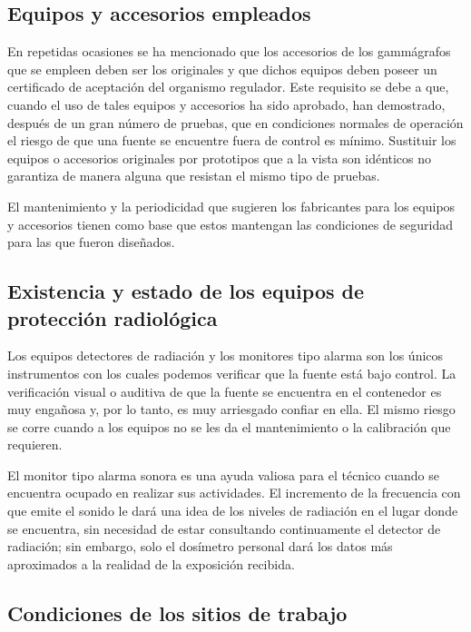 \subsection{Equipos y accesorios empleados}

En repetidas ocasiones se ha mencionado que los accesorios de los gammágrafos que se empleen deben ser los originales y que dichos equipos deben poseer un certificado de aceptación del organismo regulador. Este requisito se debe a que, cuando el uso de tales equipos y accesorios ha sido aprobado, han demostrado, después de un gran número de pruebas, que en condiciones normales de operación el riesgo de que una fuente se encuentre fuera de control es mínimo. Sustituir los equipos o accesorios originales por prototipos que a la vista son idénticos no garantiza de manera alguna que resistan el mismo tipo de pruebas.

El mantenimiento y la periodicidad que sugieren los fabricantes para los equipos y accesorios tienen como base que estos mantengan las condiciones de seguridad para las que fueron diseñados.

\subsection{Existencia y estado de los equipos de protección radiológica}

Los equipos detectores de radiación y los monitores tipo alarma son los únicos instrumentos con los cuales podemos verificar que la fuente está bajo control. La verificación visual o auditiva de que la fuente se encuentra en el contenedor es muy engañosa y, por lo tanto, es muy arriesgado confiar en ella. El mismo riesgo se corre cuando a los equipos no se les da el mantenimiento o la calibración que requieren.

El monitor tipo alarma sonora es una ayuda valiosa para el técnico cuando se encuentra ocupado en realizar sus actividades. El incremento de la frecuencia con que emite el sonido le dará una idea de los niveles de radiación en el lugar donde se encuentra, sin necesidad de estar consultando continuamente el detector de radiación; sin embargo, solo el dosímetro personal dará los datos más aproximados a la realidad de la exposición recibida.

\subsection{Condiciones de los sitios de trabajo}

